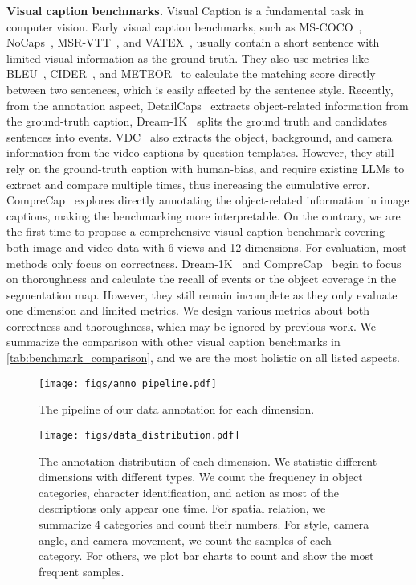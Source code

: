 \noindent\textbf{Visual caption benchmarks.}
Visual Caption is a fundamental task in computer vision. Early visual caption benchmarks, such as MS-COCO~\cite{mscoco}, NoCaps~\cite{nocaps}, MSR-VTT~\cite{msrvtt}, and VATEX~\cite{vatex}, usually contain a short sentence with limited visual information as the ground truth. They also use metrics like BLEU~\cite{papinesi2002bleu}, CIDER~\cite{vedantam2015cider}, and METEOR~\cite{banerjee2005meteor} to calculate the matching score directly between two sentences, which is easily affected by the sentence style. Recently, from the annotation aspect, DetailCaps~\cite{detailcaps} extracts object-related information from the ground-truth caption, Dream-1K~\cite{dream1k} splits the ground truth and candidates sentences into events. VDC~\cite{auroracap} also extracts the object, background, and camera information from the video captions by question templates. However, they still rely on the ground-truth caption with human-bias, and require existing LLMs to extract and compare multiple times, thus increasing the cumulative error. CompreCap~\cite{comprecap} explores directly annotating the object-related information in image captions, making the benchmarking more interpretable. On the contrary, we are the first time to propose a comprehensive visual caption benchmark covering both image and video data with 6 views and 12 dimensions. For evaluation, most methods only focus on correctness. Dream-1K~\cite{dream1k} and CompreCap~\cite{comprecap} begin to focus on thoroughness and calculate the recall of events or the object coverage in the segmentation map. However, they still remain incomplete as they only evaluate one dimension and limited metrics. We design various metrics about both correctness and thoroughness, which may be ignored by previous work. We summarize the comparison with other visual caption benchmarks in \cref{tab:benchmark_comparison}, and we are the most holistic on all listed aspects.

\begin{figure}[!t]
\centering
\texttt{[image: figs/anno\_pipeline.pdf]}
\caption{The pipeline of our data annotation for each dimension.}
\label{fig:anno_pipeline}
\vspace{-12pt}
\end{figure}


\begin{figure*}[!t]
\centering
\texttt{[image: figs/data\_distribution.pdf]}
\vspace{-8pt}
\caption{The annotation distribution of each dimension. We statistic different dimensions with different types. We count the frequency in object categories, character identification, and action as most of the descriptions only appear one time. For spatial relation, we summarize 4 categories and count their numbers. For style, camera angle, and camera movement, we count the samples of each category. For others, we plot bar charts to count and show the most frequent samples.}
\label{fig:gt_distribution}
\end{figure*}